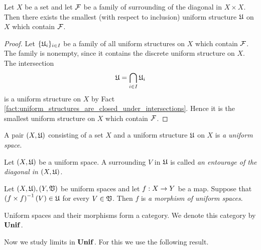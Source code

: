 \begin{corollary}\label{corollary:smallest_uniform_structure_containing_given_family_of_surroundings}
Let $X$ be a set and let ${\mathcal F}$ be a family of surrounding of the diagonal in $X\times X$. Then there exists the smallest (with respect to inclusion) uniform structure ${\mathfrak U}$ on $X$ which contain ${\mathcal F}$.
\end{corollary}
\begin{proof}
Let $\{{\mathfrak U}_i\}_{i\in I}$ be a family of all uniform structures on $X$ which contain ${\mathcal F}$. The family is nonempty, since it contains the discrete uniform structure on $X$. The intersection $${\mathfrak U} = \bigcap_{i\in I}{\mathfrak U}_i$$
is a uniform structure on $X$ by Fact \ref{fact:uniform_structures_are_closed_under_intersections}. Hence it is the smallest uniform structure on $X$ which contain ${\mathcal F}$.
\end{proof}


\begin{definition}
A pair $(X,{\mathfrak U})$ consisting of a set $X$ and a uniform structure ${\mathfrak U}$ on $X$ is \textit{a uniform space}.
\end{definition}

\begin{definition}
Let $(X,{\mathfrak U})$ be a uniform space. A surrounding $V$ in ${\mathfrak U}$ is called \textit{an entourage of the diagonal in $(X,{\mathfrak U})$}. 
\end{definition}

\begin{definition}
Let $(X,{\mathfrak U}),(Y,{\mathfrak V})$ be uniform spaces and let $f:X\rightarrow Y$ be a map. Suppose that $\left(f\times f\right)^{-1}(V) \in {\mathfrak U}$ for every $V\in {\mathfrak V}$. Then $f$ is \textit{a morphism of uniform spaces}. 
\end{definition}

\begin{remark}\label{remark:category_of_uniform_spaces}
Uniform spaces and their morphisms form a category. We denote this category by $\mathbf{Unif}$.
\end{remark}
\noindent
Now we study limits in $\mathbf{Unif}$. For this we use the following result.

